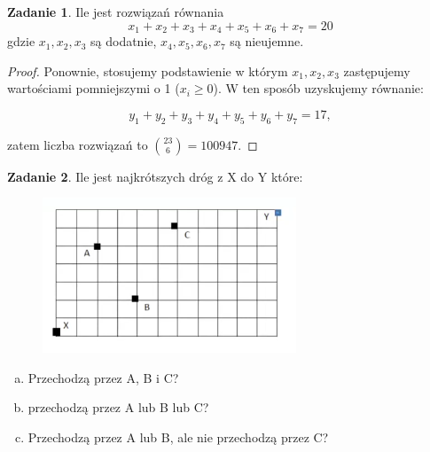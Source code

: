 \documentclass[11pt]{article}
\theoremstyle{definition}
\newtheorem{zadanie}{Zadanie}
\numberwithin{zadanie}{subsection}
\begin{document}
\begin{zadanie}
    Ile jest rozwiązań równania
    $$x_1 + x_2 + x_3 + x_4 + x_5 + x_6 + x_7 = 20$$
    gdzie $x_1, x_2, x_3$ są dodatnie, $x_4, x_5, x_6, x_7$ są nieujemne.
\end{zadanie}
\begin{proof}
    Ponownie, stosujemy podstawienie w którym $x_1,x_2,x_3$ zastępujemy wartościami pomniejszymi o 1 ($x_i\geq0$). W ten sposób uzyskujemy równanie:

    $$y_1+y_2+y_3+y_4+y_5+y_6+y_7 = 17,$$

    zatem liczba rozwiązań to $\binom{23}{6} = 100947$.
\end{proof}

\begin{zadanie}

    Ile jest najkrótszych dróg z X do Y które:

    \begin{figure}[H]
        \centering
        \includegraphics[width=0.3\linewidth]{kraty.png}
    \end{figure}

    \begin{enumerate}[a)]
        \item Przechodzą przez A, B i C?
        \item przechodzą przez A lub B lub C?
        \item Przechodzą przez A lub B, ale nie przechodzą przez C?
    \end{enumerate}
\end{zadanie}
\end{document}
